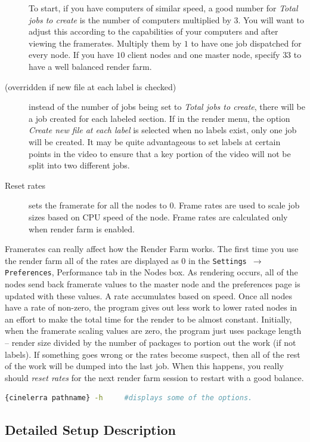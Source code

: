 \begin{description}
    To start, if you have computers of similar speed, a good number for \textit{Total jobs to create} is the number of computers multiplied by $3$.  You will want to adjust this according to the capabilities of your computers and after viewing the framerates.  Multiply them by $1$ to have one job dispatched for every node.  If you have $10$ client nodes and one master node, specify $33$ to have a well balanced render farm.
    \item[(overridden if new file at each label is checked)] instead of the number of jobs being set to \textit{Total jobs to create}, there will be a job created for each labeled section.  If in the render menu, the option \textit{Create new file at each label} is selected when no labels exist, only one job will be created.  It may be quite advantageous to set labels at certain points in the video to ensure that a key portion of the video will not be split into two different jobs.
    \item[Reset rates] sets the framerate for all the nodes to $0$.  Frame rates are used to scale job sizes based on CPU speed of the node.  Frame rates are calculated only when render farm is enabled.
\end{description}

Framerates can really affect how the Render Farm works.  The first time you use the render farm all of the rates are displayed as $0$ in the \texttt{Settings $\rightarrow$ Preferences}, Performance tab in the Nodes box.  As rendering occurs, all of the nodes send back framerate values to the master node and the preferences page is updated with these values.  A rate accumulates based on speed.  Once all nodes have a rate of non-zero, the program gives out less work to lower rated nodes in an effort to make the total time for the render to be almost constant.
Initially, when the framerate scaling values are zero, the program just uses package length -- render size 
divided by the number of packages to portion out the work (if not labels).  If something goes wrong or the rates become suspect, then all of the rest of the work will be dumped into the last job.  When this happens, you really should \textit{reset rates} for the next render farm session to restart with a good balance.

\begin{lstlisting}[language=bash,numbers=none]
    {cinelerra pathname} -h     #displays some of the options.
\end{lstlisting}

\subsection{Detailed Setup Description}%
\label{sub:detailed_setup_description}

